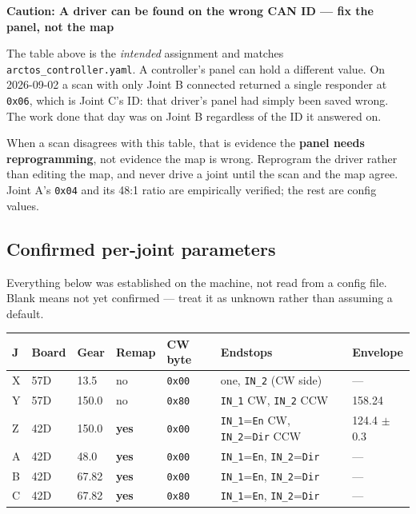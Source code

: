 \documentclass[11pt,letterpaper]{article}
\newenvironment{caution}[1]{%
    \par\addvspace{8pt}%
    \noindent{\color{cautionred}\rule{\linewidth}{0.8pt}}\par\vspace{2pt}
    \noindent\textbf{\color{cautionred}Caution: #1}\par\vspace{2pt}
}{%
    \par\vspace{2pt}\noindent{\color{cautionred}\rule{\linewidth}{0.4pt}}%
    \par\addvspace{8pt}%
}
\begin{document}
\begin{caution}{A driver can be found on the wrong CAN ID --- fix the panel, not the map}
The table above is the \emph{intended} assignment and matches
\texttt{arctos\_controller.yaml}. A controller's panel can hold a different value.
On 2026-09-02 a scan with only Joint B connected returned a single responder at
\texttt{0x06}, which is Joint C's ID: that driver's panel had simply been saved
wrong. The work done that day was on Joint B regardless of the ID it answered on.

When a scan disagrees with this table, that is evidence the \textbf{panel needs
reprogramming}, not evidence the map is wrong. Reprogram the driver rather than
editing the map, and never drive a joint until the scan and the map agree. Joint
A's \texttt{0x04} and its 48:1 ratio are empirically verified; the rest are config
values.
\end{caution}

\subsection{Confirmed per-joint parameters}
\label{sec:joint-params}
Everything below was established on the machine, not read from a config file.
Blank means not yet confirmed --- treat it as unknown rather than assuming a
default.

\begin{center}
\begin{tabular}{lllllll}
\toprule
\textbf{J} & \textbf{Board} & \textbf{Gear} & \textbf{Remap} & \textbf{CW byte}
  & \textbf{Endstops} & \textbf{Envelope} \\ \midrule
X & 57D & 13.5   & no  & \texttt{0x00} & one, \texttt{IN\_2} (CW side) & --- \\
Y & 57D & 150.0  & no  & \texttt{0x80} & \texttt{IN\_1} CW, \texttt{IN\_2} CCW & 158.24\textdegree{} \\
Z & 42D & 150.0  & \textbf{yes} & \texttt{0x00} & \texttt{IN\_1}=\texttt{En} CW, \texttt{IN\_2}=\texttt{Dir} CCW & 124.4\textdegree{} $\pm$0.3 \\
A & 42D & 48.0   & \textbf{yes} & \texttt{0x00} & \texttt{IN\_1}=\texttt{En}, \texttt{IN\_2}=\texttt{Dir} & --- \\
B & 42D & 67.82  & \textbf{yes} & \texttt{0x00} & \texttt{IN\_1}=\texttt{En}, \texttt{IN\_2}=\texttt{Dir} & --- \\
C & 42D & 67.82  & \textbf{yes} & \texttt{0x80} & \texttt{IN\_1}=\texttt{En}, \texttt{IN\_2}=\texttt{Dir} & --- \\
\bottomrule
\end{tabular}
\end{center}
\end{document}
